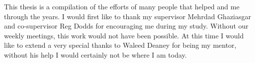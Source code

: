 

This thesis is a compilation of the efforts of many people that helped and
me through the years. I would first like to thank my supervisor Mehrdad Ghaziasgar and co-supervisor Reg Dodds for encouraging me during my study. Without our weekly meetings, this work would not have been possible. 
At this time I would like to extend a very special thanks to Waleed Deaney for being my mentor, without his help I would certainly not be where I am today.

